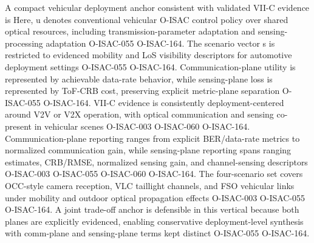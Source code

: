 {}A compact vehicular deployment anchor consistent with validated VII-C evidence is\markdownRendererInterblockSeparator
{}\markdownRendererInterblockSeparator
{}\markdownRendererInterblockSeparator
{}Here, u denotes conventional vehicular O-ISAC control policy over shared optical resources, including transmission-parameter adaptation and sensing-processing adaptation O-ISAC-055 O-ISAC-164. The scenario vector s is restricted to evidenced mobility and LoS visibility descriptors for automotive deployment settings O-ISAC-055 O-ISAC-164. Communication-plane utility is represented by achievable data-rate behavior, while sensing-plane loss is represented by ToF-CRB cost, preserving explicit metric-plane separation O-ISAC-055 O-ISAC-164.\markdownRendererParagraphSeparator
{}\markdownRendererInterblockSeparator
{}\markdownRendererUlBeginTight
\markdownRendererUlItem VII-C evidence is consistently deployment-centered around V2V or V2X operation, with optical communication and sensing co-present in vehicular scenes O-ISAC-003 O-ISAC-060 O-ISAC-164.\markdownRendererUlItemEnd 
\markdownRendererUlItem Communication-plane reporting ranges from explicit BER/data-rate metrics to normalized communication gain, while sensing-plane reporting spans ranging estimates, CRB/RMSE, normalized sensing gain, and channel-sensing descriptors O-ISAC-003 O-ISAC-055 O-ISAC-060 O-ISAC-164.\markdownRendererUlItemEnd 
\markdownRendererUlItem The four-scenario set covers OCC-style camera reception, VLC taillight channels, and FSO vehicular links under mobility and outdoor optical propagation effects O-ISAC-003 O-ISAC-055 O-ISAC-164.\markdownRendererUlItemEnd 
\markdownRendererUlItem A joint trade-off anchor is defensible in this vertical because both planes are explicitly evidenced, enabling conservative deployment-level synthesis with comm-plane and sensing-plane terms kept distinct O-ISAC-055 O-ISAC-164.\markdownRendererUlItemEnd 
\markdownRendererUlEndTight \markdownRendererInterblockSeparator
{}
\markdownRendererSectionEnd 
\markdownRendererSectionEnd \markdownRendererSectionBegin
{}\markdownRendererInterblockSeparator
{}\markdownRendererSectionBegin
{}\markdownRendererInterblockSeparator
